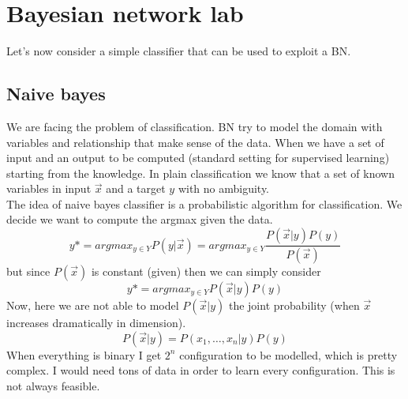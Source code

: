 \chapter{Bayesian network lab}
\label{cha:bay_net_lab}

Let's now consider a simple classifier that can be used to exploit a BN.\\

\section{Naive bayes}
We are facing the problem of classification. BN try to model the domain with variables and relationship that make sense of the data. 
When we have a set of input and an output to be computed (standard setting for supervised learning) starting from the knowledge. 
In plain classification we know that a set of known variables in input $\Vec{x}$ and a target $y$ with no ambiguity.\\
The idea of naive bayes classifier is a probabilistic algorithm for classification. We decide we want to compute the argmax given the data. 
$$y* = argmax_{y \in Y} P(y|\Vec{x}) = argmax _{y \in Y} \frac{P(\Vec{x}|y)P(y)}{P(\Vec{x})}$$
but since $P(\Vec{x})$ is constant (given) then we can simply consider 
$$y* = argmax_{y \in Y} {P(\Vec{x}|y)P(y)}$$
Now, here we are not able to model $P(\Vec{x}|y)$ the joint probability (when $\Vec{x}$ increases dramatically in dimension). 
$$P(\Vec{x}|y) = P(x_1, \dots, x_n| y) P(y)$$
When everything is binary I get $2^n$ configuration to be modelled, which is pretty complex. I would need tons of data in order to learn every configuration. This is not always feasible.\\

